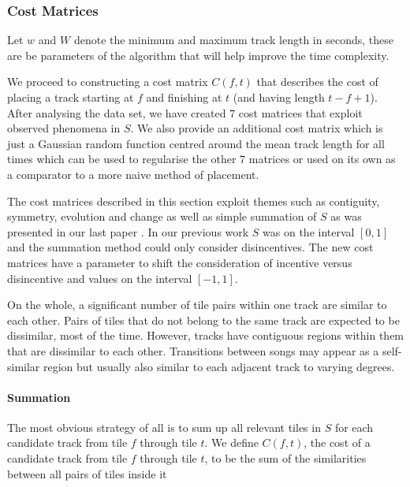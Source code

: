 \documentclass[twocolumn]{article}
\begin{document}
	\subsubsection{Cost Matrices}\label{sec:cost-matrices}
	
	Let $w$ and $W$ denote the minimum and maximum track length in seconds, these are be parameters of the algorithm that will help improve the time complexity. 
	
We proceed to constructing a cost matrix $C(f,t)$ that describes the
cost of placing a track starting at $f$ and finishing at $t$ (and
having length $t-f+1$). After analysing the data set, we have created
$7$ cost matrices that exploit observed phenomena in $S$. We also
provide an additional cost matrix which is just a Gaussian random
function centred around the mean track length for all times which can
be used to regularise the other $7$ matrices or used on its own as a
comparator to a more naive method of placement.
	
	The cost matrices described in this section exploit themes such as contiguity, symmetry, evolution and change as well as simple summation of $S$ as was presented in our last paper \citep{scarfe2013long}. In our previous work $S$ was on the interval $[0,1]$ and the summation method could only consider disincentives. The new cost matrices have a parameter to shift the consideration of incentive versus disincentive and values on the interval $[-1,1]$.
	
	On the whole, a significant number of tile pairs within one track are similar to each other. Pairs of tiles that do not belong to the same track are expected to be dissimilar, most of the time. However, tracks have contiguous regions within them that are dissimilar to each other. Transitions between songs may appear as a self-similar region but usually also similar to each adjacent track to varying degrees.  
	
	\paragraph{Summation}\label{sec:summation}
	
	The most obvious strategy of all is to sum up all relevant tiles in $S$ for each candidate track from tile $f$ through tile $t$. We define $C(f,t)$, the cost of a candidate track from tile $f$ through tile $t$, to be the sum of the similarities between all pairs of tiles inside it
\end{document}

